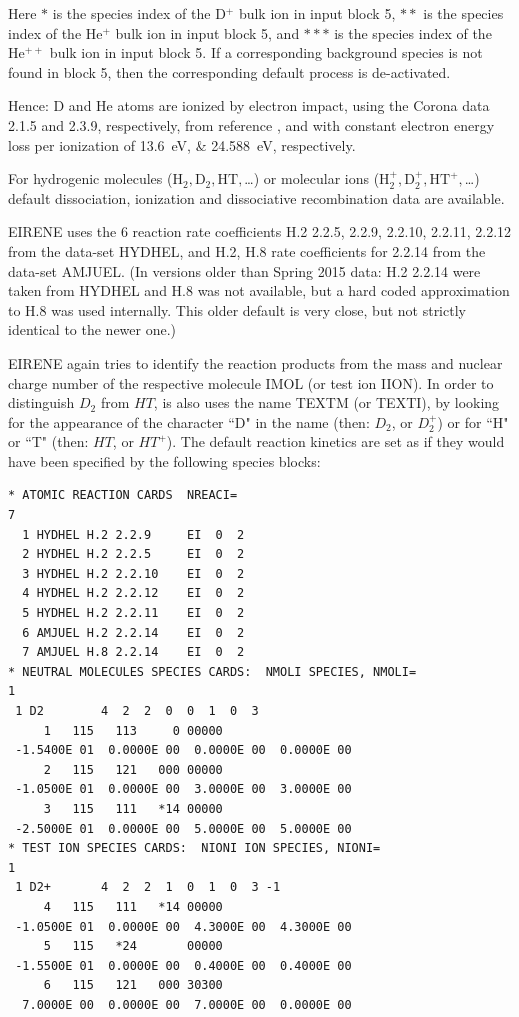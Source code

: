 Here $\ast$ is the species index of the D$^+$ bulk ion in input block 5,
$\ast\ast$ is the species index of the He$^+$ bulk ion in input block 5, and
$\ast\ast\ast$ is the species index of the He$^{++}$ bulk ion in input block 5.
If a corresponding background species is not found in block 5, then the
corresponding default process is de-activated.

Hence: D and He atoms are ionized by electron impact, using the Corona data
2.1.5 and 2.3.9, respectively, from reference \cite{kn:Janev}, and with
constant electron energy loss per ionization of
\SIlist{13.6;24.588}{\electronvolt}, respectively.


For hydrogenic molecules ($\mathrm{H_2, D_2, HT,}$\dots) or molecular ions
($\mathrm{H_2^+, D_2^+, HT^+,}$\dots)  default dissociation, ionization and
dissociative recombination data are available.

EIRENE	uses the 6 reaction rate coefficients  H.2  2.2.5, 2.2.9, 2.2.10,
2.2.11, 2.2.12	      from the data-set HYDHEL,  \cite{kn:Janev} and H.2, H.8
rate coefficients for 2.2.14 from the data-set AMJUEL.
(In versions older than Spring 2015 data: H.2 2.2.14 were taken from HYDHEL and
H.8 was not available, but a hard coded approximation to H.8 was used
internally.
This older default is very close, but not strictly identical to the newer one.)

EIRENE again tries to identify the reaction products from the mass and nuclear
charge number of the respective molecule IMOL (or test ion IION).
In order to distinguish $D_2$ from $HT$, is also uses the name TEXTM (or
TEXTI), by looking for the appearance of the character ``D" in the name (then:
$D_2$, or $D_2^+$) or for ``H" or ``T"	(then: $HT$, or $HT^+$).
The default reaction kinetics are set as if they would have been specified by
the following species blocks:

\begin{lstlisting}
* ATOMIC REACTION CARDS  NREACI=
7
  1 HYDHEL H.2 2.2.9     EI  0  2
  2 HYDHEL H.2 2.2.5     EI  0  2
  3 HYDHEL H.2 2.2.10    EI  0  2
  4 HYDHEL H.2 2.2.12    EI  0  2
  5 HYDHEL H.2 2.2.11    EI  0  2
  6 AMJUEL H.2 2.2.14    EI  0  2
  7 AMJUEL H.8 2.2.14    EI  0  2
* NEUTRAL MOLECULES SPECIES CARDS:  NMOLI SPECIES, NMOLI=
1
 1 D2        4  2  2  0  0  1  0  3
     1   115   113     0 00000
 -1.5400E 01  0.0000E 00  0.0000E 00  0.0000E 00
     2   115   121   000 00000
 -1.0500E 01  0.0000E 00  3.0000E 00  3.0000E 00
     3   115   111   *14 00000
 -2.5000E 01  0.0000E 00  5.0000E 00  5.0000E 00
* TEST ION SPECIES CARDS:  NIONI ION SPECIES, NIONI=
1
 1 D2+       4  2  2  1  0  1  0  3 -1
     4   115   111   *14 00000
 -1.0500E 01  0.0000E 00  4.3000E 00  4.3000E 00
     5   115   *24       00000
 -1.5500E 01  0.0000E 00  0.4000E 00  0.4000E 00
     6   115   121   000 30300
  7.0000E 00  0.0000E 00  7.0000E 00  0.0000E 00
\end{lstlisting}

